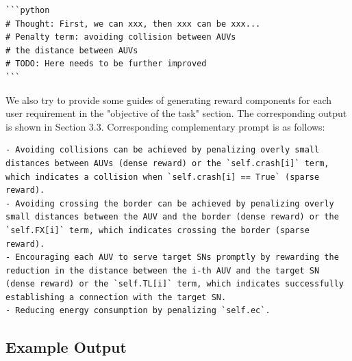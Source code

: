 \documentclass{article}
\begin{document}
\begin{verbatim}
```python
# Thought: First, we can xxx, then xxx can be xxx...
# Penalty term: avoiding collision between AUVs
# the distance between AUVs 
# TODO: Here needs to be further improved
```

\end{verbatim}

We also try to provide some guides of generating reward components for each user requirement in the "objective of the task" section. The corresponding output is shown in Section 3.3. Corresponding complementary prompt is as follows:

\begin{verbatim}
- Avoiding collisions can be achieved by penalizing overly small distances between AUVs (dense reward) or the `self.crash[i]` term, which indicates a collision when `self.crash[i] == True` (sparse reward). 
- Avoiding crossing the border can be achieved by penalizing overly small distances between the AUV and the border (dense reward) or the `self.FX[i]` term, which indicates crossing the border (sparse reward). 
- Encouraging each AUV to serve target SNs promptly by rewarding the reduction in the distance between the i-th AUV and the target SN (dense reward) or the `self.TL[i]` term, which indicates successfully establishing a connection with the target SN. 
- Reducing energy consumption by penalizing `self.ec`.

\end{verbatim}

\subsection{Example Output}
\end{document}
